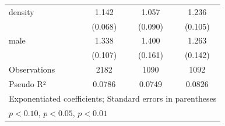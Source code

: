 \begin{table}[htbp]
\begin{tabular}{l*{3}{c}}
\addlinespace
density     &       1.142\sym{**} &       1.057         &       1.236\sym{**} \\
            &     (0.068)         &     (0.090)         &     (0.105)         \\
\addlinespace
male        &       1.338\sym{***}&       1.400\sym{***}&       1.263\sym{**} \\
            &     (0.107)         &     (0.161)         &     (0.142)         \\
\midrule
Observations&        2182         &        1090         &        1092         \\
Pseudo R²  &      0.0786         &      0.0749         &      0.0826         \\
\bottomrule
\multicolumn{4}{l}{\footnotesize Exponentiated coefficients; Standard errors in parentheses}\\
\multicolumn{4}{l}{\footnotesize \sym{*} \(p<0.10\), \sym{**} \(p<0.05\), \sym{***} \(p<0.01\)}\\
\end{tabular}
\end{table}
